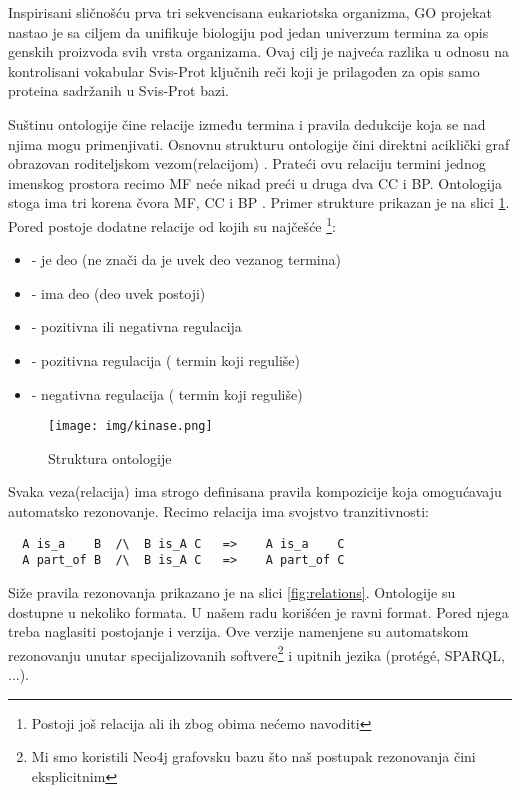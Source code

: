 Inspirisani sličnošću prva tri sekvencisana eukariotska organizma, GO projekat
nastao je sa ciljem da  unifikuje biologiju pod jedan univerzum termina za opis
genskih proizvoda svih vrsta organizama\parencite{GO2000}. Ovaj cilj je najveća
razlika u odnosu na kontrolisani vokabular Svis-Prot ključnih reči koji je
prilagođen za opis samo proteina sadržanih u Svis-Prot bazi.

Suštinu ontologije čine relacije između termina i pravila dedukcije koja se nad
njima mogu primenjivati. Osnovnu strukturu ontologije čini direktni aciklički
graf  obrazovan roditeljskom vezom(relacijom) . Prateći
ovu relaciju termini jednog imenskog prostora recimo MF neće nikad preći u
druga dva CC i BP.  Ontologija stoga ima tri korena čvora MF, CC i BP
\parencite{go_struktura}. Primer strukture prikazan je na
slici \ref{fig:kinase}.  Pored  postoje dodatne relacije od kojih
su najčešće \footnote{Postoji još relacija ali ih zbog obima nećemo navoditi}:

\begin{itemize}
  \item {}  - je deo  (ne znači da je uvek deo vezanog termina)
  \item {} - ima deo (deo uvek postoji)
  \item {} - pozitivna ili negativna regulacija
  \item {} - pozitivna regulacija  
    ( termin koji reguliše)
  \item {} - negativna regulacija 
    ( termin koji reguliše)
\end{itemize}

\begin{figure}[h!]
  \centering
  \texttt{[image: img/kinase.png]}
  \caption{Struktura ontologije}
  \label{fig:kinase}
\end{figure}

Svaka veza(relacija) ima strogo definisana pravila kompozicije koja omogućavaju
automatsko rezonovanje. Recimo relacija  ima svojstvo
tranzitivnosti\parencite{is_a}:
\begin{verbatim}
  A is_a    B  /\  B is_A C   =>    A is_a    C           
  A part_of B  /\  B is_A C   =>    A part_of C
\end{verbatim}

Siže pravila rezonovanja prikazano je na slici \ref{fig:relations}. Ontologije su
dostupne u nekoliko formata. U našem radu korišćen je ravni  format.
Pored njega treba naglasiti postojanje  i  verzija.
Ove verzije namenjene su automatskom rezonovanju unutar specijalizovanih
softvere\footnote{Mi smo koristili Neo4j grafovsku bazu što naš postupak
rezonovanja čini eksplicitnim} i upitnih jezika (protégé, SPARQL, ...).

